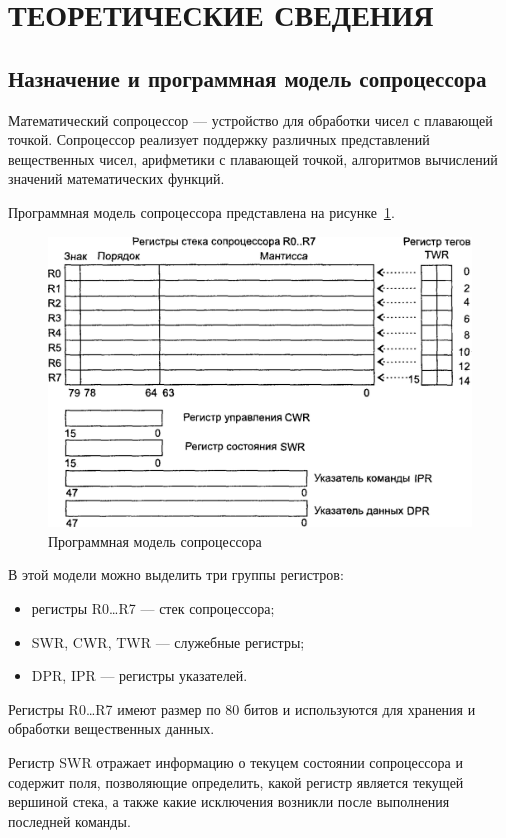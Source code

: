 \section{ТЕОРЕТИЧЕСКИЕ СВЕДЕНИЯ}

\subsection{Назначение и программная модель сопроцессора}

Математический сопроцессор --- устройство для обработки чисел с плавающей точкой.
Сопроцессор реализует поддержку различных представлений вещественных чисел,
арифметики с плавающей точкой, алгоритмов вычислений значений математических функций.

Программная модель сопроцессора представлена на рисунке~\ref{pic:program_model}.

\begin{figure}[h!]
  \centering
  \includegraphics[width=0.8\linewidth]{pic/program_model}
  \caption{Программная модель сопроцессора}
  \label{pic:program_model}
\end{figure}

В этой модели можно выделить три группы регистров:
\begin{itemize}
\item регистры R0\dots R7 --- стек сопроцессора;
\item SWR, CWR, TWR --- служебные регистры;
\item DPR, IPR --- регистры указателей.
\end{itemize}

Регистры R0\dots R7 имеют размер по 80 битов и используются для
хранения и обработки вещественных данных.

Регистр SWR отражает информацию о текуцем состоянии сопроцессора и
содержит поля, позволяющие определить, какой регистр является текущей вершиной
стека, а также какие исключения возникли после выполнения последней команды.

